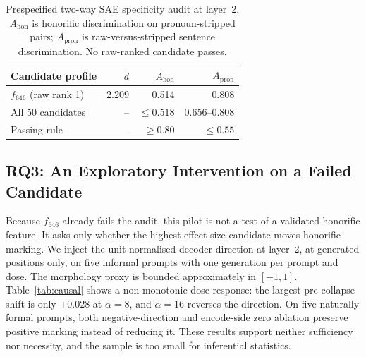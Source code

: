 \documentclass[11pt]{article}
\begin{document}
\begin{table}[t]
\centering
\small
\begin{tabular}{lrrr}
\toprule
\textbf{Candidate profile} & $d$ & $A_{\mathrm{hon}}$ & $A_{\mathrm{pron}}$ \\
\midrule
$f_{646}$ (raw rank 1) & 2.209 & 0.514 & 0.808 \\
All 50 candidates & -- & $\leq0.518$ & 0.656--0.808 \\
Passing rule & -- & $\geq0.80$ & $\leq0.55$ \\
\bottomrule
\end{tabular}
\caption{Prespecified two-way SAE specificity audit at layer~2.
  $A_{\mathrm{hon}}$ is honorific discrimination on pronoun-stripped pairs;
  $A_{\mathrm{pron}}$ is raw-versus-stripped sentence discrimination. No
  raw-ranked candidate passes.}
\label{tab:features}
\end{table}

\subsection{RQ3: An Exploratory Intervention on a Failed Candidate}
\label{sec:rq3-results}

Because $f_{646}$ already fails the audit, this pilot is not a test of a
validated honorific feature. It asks only whether the highest-effect-size
candidate moves honorific marking. We inject the unit-normalised decoder
direction at layer~2, at generated positions only, on five informal prompts with
one generation per prompt and dose. The morphology proxy is bounded
approximately in $[-1,1]$. Table~\ref{tab:causal} shows a non-monotonic dose
response: the largest pre-collapse shift is only $+0.028$ at $\alpha=8$, and
$\alpha=16$ reverses the direction. On five naturally formal prompts, both
negative-direction and encode-side zero ablation preserve positive marking
instead of reducing it. These results support neither sufficiency nor
necessity, and the sample is too small for inferential statistics.
\end{document}
